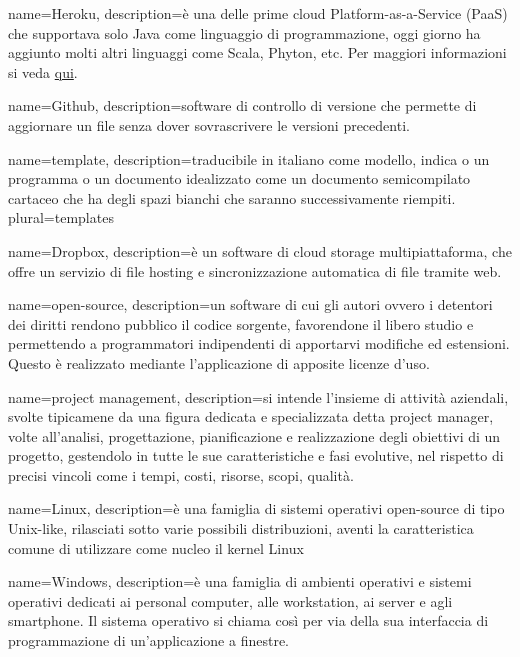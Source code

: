 { {
	name=Heroku,
	description={è una  delle prime cloud Platform-as-a-Service (PaaS) che supportava solo Java come linguaggio di programmazione, oggi giorno ha aggiunto molti altri linguaggi come Scala, Phyton, etc. Per maggiori informazioni si veda \href{https://www.heroku.com}{qui}.}
}

 {
	name=Github,
	description={software di controllo di versione che permette di aggiornare un file senza dover sovrascrivere le versioni precedenti.}
}

 {
	name=template,
	description={traducibile in italiano come modello, indica o un programma o un documento idealizzato come un documento semicompilato cartaceo che ha degli spazi bianchi che saranno successivamente riempiti.}
	plural=templates
}

 {
	name=Dropbox,
	description={è un software di cloud storage multipiattaforma, che offre un servizio di file hosting e sincronizzazione automatica di file tramite web.}
}

 {
	name=open-source,
	description={un software di cui gli autori ovvero i detentori dei diritti rendono pubblico il codice sorgente, favorendone il libero studio e permettendo a programmatori indipendenti di apportarvi modifiche ed estensioni. Questo è realizzato mediante l’applicazione di apposite licenze d’uso. }
}

 {
	name=project management,
	description={si intende l'insieme di attività aziendali, svolte tipicamene da una figura dedicata e specializzata detta project manager, volte all'analisi, progettazione, pianificazione e realizzazione degli obiettivi di un progetto, gestendolo in tutte le sue caratteristiche e fasi evolutive, nel rispetto di precisi vincoli come i tempi, costi, risorse, scopi, qualità.}
}

 {
	name=Linux,
	description={è una famiglia di sistemi operativi open-source di tipo Unix-like, rilasciati sotto varie possibili distribuzioni, aventi la caratteristica comune di utilizzare come nucleo il kernel Linux}
}

 {
	name=Windows,
	description={è una famiglia di ambienti operativi e sistemi operativi dedicati ai personal computer, alle workstation, ai server e agli smartphone. Il sistema operativo si chiama così per via della sua interfaccia di programmazione di un'applicazione a finestre.}
}

}
